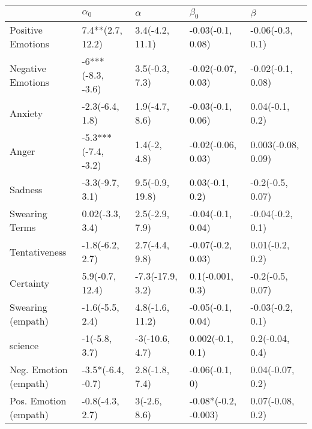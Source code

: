 \begin{tabular}{lllll}
\toprule
{} &           $\alpha_0$ &          $\alpha$ &             $\beta_0$ &             $\beta$ \\
\midrule
Positive Emotions     &     7.4**(2.7, 12.2) &   3.4(-4.2, 11.1) &     -0.03(-0.1, 0.08) &    -0.06(-0.3, 0.1) \\
Negative Emotions     &    -6***(-8.3, -3.6) &    3.5(-0.3, 7.3) &    -0.02(-0.07, 0.03) &   -0.02(-0.1, 0.08) \\
Anxiety               &      -2.3(-6.4, 1.8) &    1.9(-4.7, 8.6) &     -0.03(-0.1, 0.06) &     0.04(-0.1, 0.2) \\
Anger                 &  -5.3***(-7.4, -3.2) &      1.4(-2, 4.8) &    -0.02(-0.06, 0.03) &  0.003(-0.08, 0.09) \\
Sadness               &      -3.3(-9.7, 3.1) &   9.5(-0.9, 19.8) &       0.03(-0.1, 0.2) &    -0.2(-0.5, 0.07) \\
Swearing Terms        &      0.02(-3.3, 3.4) &    2.5(-2.9, 7.9) &     -0.04(-0.1, 0.04) &    -0.04(-0.2, 0.1) \\
Tentativeness         &      -1.8(-6.2, 2.7) &    2.7(-4.4, 9.8) &     -0.07(-0.2, 0.03) &     0.01(-0.2, 0.2) \\
Certainty             &      5.9(-0.7, 12.4) &  -7.3(-17.9, 3.2) &      0.1(-0.001, 0.3) &    -0.2(-0.5, 0.07) \\
Swearing (empath)     &      -1.6(-5.5, 2.4) &   4.8(-1.6, 11.2) &     -0.05(-0.1, 0.04) &    -0.03(-0.2, 0.1) \\
science               &        -1(-5.8, 3.7) &    -3(-10.6, 4.7) &      0.002(-0.1, 0.1) &     0.2(-0.04, 0.4) \\
Neg. Emotion (empath) &    -3.5*(-6.4, -0.7) &    2.8(-1.8, 7.4) &        -0.06(-0.1, 0) &    0.04(-0.07, 0.2) \\
Pos. Emotion (empath) &      -0.8(-4.3, 2.7) &      3(-2.6, 8.6) &  -0.08*(-0.2, -0.003) &    0.07(-0.08, 0.2) \\
\bottomrule
\end{tabular}
